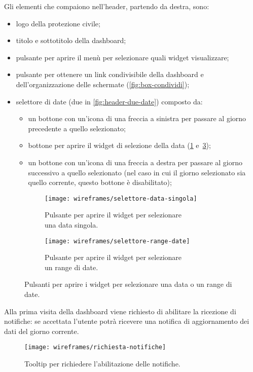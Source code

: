 \documentclass[../../../main.tex]{subfiles}
\begin{document}
Gli elementi che compaiono nell'header, partendo da destra, sono:
\begin{itemize}
    \item logo della protezione civile;
    \item titolo e sottotitolo della dashboard;
    \item pulsante per aprire il menù per selezionare quali widget visualizzare;
    \item pulsante per ottenere un link condivisibile della dashboard e dell'organizzazione delle schermate (\ref{fig:box-condividi});
    \item selettore di date (due in \ref{fig:header-due-date}) composto da:
    \begin{itemize}
        \item un bottone con un'icona di una freccia a sinistra per passare al giorno precedente a quello selezionato;
        \item bottone per aprire il widget di selezione della data (\ref{fig:selettore-data-singola} e~\ref{fig:selettore-range-date});
        \item un bottone con un'icona di una freccia a destra per passare al giorno successivo a quello selezionato (nel caso in cui il giorno selezionato sia quello corrente, questo bottone è disabilitato);
    \end{itemize}
\end{itemize}

\begin{figure}[H]
    \begin{subfigure}[b]{0.5\textwidth}
        \centering
        \texttt{[image: wireframes/selettore-data-singola]}
        \caption{Pulsante per aprire il widget per selezionare\\ una data singola.}\label{fig:selettore-data-singola}
    \end{subfigure}
\hfill
    \begin{subfigure}[b]{0.5\textwidth}
        \centering
        \texttt{[image: wireframes/selettore-range-date]}
        \caption{Pulsante per aprire il widget per selezionare\\un range di date.}\label{fig:selettore-range-date}
    \end{subfigure}
    \caption{Pulsanti per aprire i widget per selezionare una data o un range di date.}
\end{figure}

Alla prima visita della dashboard viene richiesto di abilitare la ricezione di notifiche: se accettata l'utente potrà ricevere una notifica di aggiornamento dei dati del giorno corrente.
\begin{figure}[H]
    \centering
    \texttt{[image: wireframes/richiesta-notifiche]}
    \caption{Tooltip per richiedere l'abilitazione delle notifiche.}\label{fig:richiesta-notifiche}
\end{figure}
\end{document}
